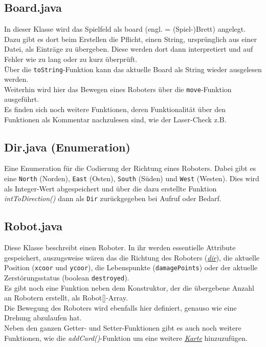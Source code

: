\documentclass[12pt,a4paper,oneside]{book}
\theoremstyle{plain}
\numberwithin{equation}{chapter} \DeclareMathOperator{\Var}{Var}
\begin{document}
\subsection{Board.java}
    In dieser Klasse wird das Spielfeld als board (engl. = (Spiel-)Brett) angelegt. Dazu gibt es dort beim Erstellen die Pflicht, einen String, ursprünglich aus einer Datei, als Einträge zu übergeben. Diese werden dort dann interpretiert und auf Fehler wie zu lang oder zu kurz überprüft.\\
    Über die \texttt{toString}-Funktion kann das aktuelle Board als String wieder ausgelesen werden.\\
    Weiterhin wird hier das Bewegen eines Roboters über die \texttt{move}-Funktion ausgeführt.\\
    Es finden sich noch weitere Funktionen, deren Funktionalität über den Funktionen als Kommentar nachzulesen sind, wie der Laser-Check z.B.
    
\hypertarget{Dir.java}{}
\subsection{Dir.java (Enumeration)}
    Eine Enumeration für die Codierung der Richtung eines Roboters. Dabei gibt es eine \texttt{North} (Norden), \texttt{East} (Osten), \texttt{South} (Süden) und \texttt{West} (Westen). Dies wird als Integer-Wert abgespeichert und über die dazu erstellte Funktion \textit{intToDirection()} dann als \texttt{Dir} zurückgegeben bei Aufruf oder Bedarf.
    
\subsection{Robot.java}
    Diese Klasse beschreibt einen Roboter. In ihr werden essentielle Attribute gespeichert, auszugsweise wären das die Richtung des Roboters (\hyperlink{Dir.java}{\textit{dir}}), die aktuelle Position (\texttt{xcoor} und \texttt{ycoor}), die Lebenspunkte (\texttt{damagePoints}) oder der aktuelle Zerstörungsstatus (boolean \texttt{destroyed}). \\
    Es gibt noch eine Funktion neben dem Konstruktor, der die übergebene Anzahl an Robotern erstellt, als Robot[]-Array. \\
    Die Bewegung des Roboters wird ebenfalls hier definiert, genauso wie eine Drehung abzulaufen hat. \\
    Neben den ganzen Getter- und Setter-Funktionen gibt es auch noch weitere Funktionen, wie die \textit{addCard()}-Funktion um eine weitere \hyperlink{Card.java}{\textit{Karte}} hinzuzufügen.
\end{document}
